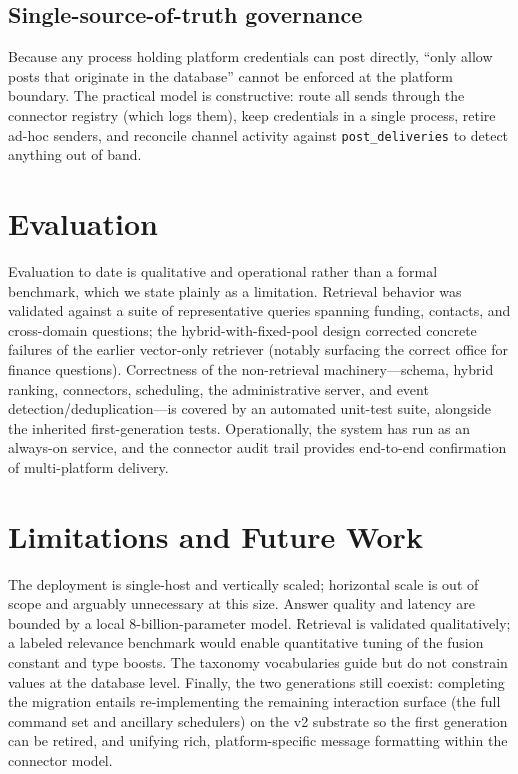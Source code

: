 \documentclass[11pt,letterpaper]{article}
\newcommand{\code}[1]{\texttt{\small #1}}
\begin{document}
\subsection{Single-source-of-truth governance}
Because any process holding platform credentials can post directly, ``only allow posts
that originate in the database'' cannot be enforced at the platform boundary. The
practical model is constructive: route all sends through the connector registry (which
logs them), keep credentials in a single process, retire ad-hoc senders, and reconcile
channel activity against \code{post\_deliveries} to detect anything out of band.

\section{Evaluation}

Evaluation to date is qualitative and operational rather than a formal benchmark, which
we state plainly as a limitation. Retrieval behavior was validated against a suite of
representative queries spanning funding, contacts, and cross-domain questions; the
hybrid-with-fixed-pool design corrected concrete failures of the earlier vector-only
retriever (notably surfacing the correct office for finance questions). Correctness of
the non-retrieval machinery---schema, hybrid ranking, connectors, scheduling, the
administrative server, and event detection/deduplication---is covered by an automated
unit-test suite, alongside the inherited first-generation tests. Operationally, the
system has run as an always-on service, and the connector audit trail provides
end-to-end confirmation of multi-platform delivery.

\section{Limitations and Future Work}

The deployment is single-host and vertically scaled; horizontal scale is out of scope
and arguably unnecessary at this size. Answer quality and latency are bounded by a
local 8-billion-parameter model. Retrieval is validated qualitatively; a labeled
relevance benchmark would enable quantitative tuning of the fusion constant and type
boosts. The taxonomy vocabularies guide but do not constrain values at the database
level. Finally, the two generations still coexist: completing the migration entails
re-implementing the remaining interaction surface (the full command set and ancillary
schedulers) on the v2 substrate so the first generation can be retired, and unifying
rich, platform-specific message formatting within the connector model.
\end{document}
